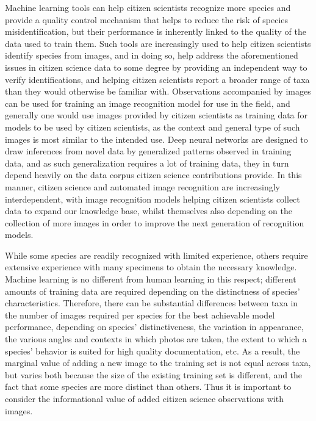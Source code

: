\documentclass{article}
\begin{document}
Machine learning tools can help citizen scientists recognize more species and provide a quality control mechanism that helps to reduce the risk of species misidentification\autocite{Christin2019}, but their performance is inherently linked to the quality of the data used to train them. Such tools are increasingly used to help citizen scientists identify species from images\autocite{Weinstein2017,Wldchen2018,Ceccaroni2019}, and in doing so, help address the aforementioned issues in citizen science data to some degree by providing an independent way to verify identifications, and helping citizen scientists report a broader range of taxa than they would otherwise be familiar with\autocite{Wldchen2018_27}. Observations accompanied by images can be used for training an image recognition model for use in the field, and generally one would use images provided by citizen scientists as training data for models to be used by citizen scientists, as the context and general type of such images is most similar to the intended use. Deep neural networks are designed to draw inferences from novel data by generalized patterns observed in training data\autocite{Goodfellow-et-al-2016}, and as such generalization requires a lot of training data, they in turn depend heavily on the data corpus citizen science contributions provide. In this manner, citizen science and automated image recognition are increasingly interdependent, with image recognition models helping citizen scientists collect data to expand our knowledge base, whilst themselves also depending on the collection of more images in order to improve the next generation of recognition models.

While some species are readily recognized with limited experience, others require extensive experience with many specimens to obtain the necessary knowledge. Machine learning is no different from human learning in this respect; different amounts of training data are required depending on the distinctness of species' characteristics. Therefore, there can be substantial differences between taxa in the number of images required per species for the best achievable model performance, depending on species' distinctiveness, the variation in appearance, the various angles and contexts in which photos are taken, the extent to which a species' behavior is suited for high quality documentation, etc.\autocite{Wldchen2018_27,Terry2020, vanhorn2018} As a result, the marginal value of adding a new image to the training set is not equal across taxa, but varies both because the size of the existing training set is different, and the fact that some species are more distinct than others. Thus it is important to consider the informational value of added citizen science observations with images.
\end{document}
